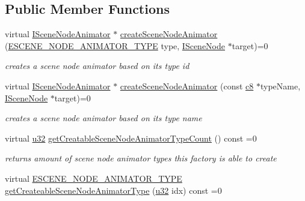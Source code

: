 \subsection*{Public Member Functions}
\begin{DoxyCompactItemize}
\item 
virtual \hyperlink{classirr_1_1scene_1_1ISceneNodeAnimator}{I\+Scene\+Node\+Animator} $\ast$ \hyperlink{classirr_1_1scene_1_1ISceneNodeAnimatorFactory_a509845a16fa1fdd7241bb10416327eb2}{create\+Scene\+Node\+Animator} (\hyperlink{namespaceirr_1_1scene_a327a1e43872705cf8f3f3342fb307d19}{E\+S\+C\+E\+N\+E\+\_\+\+N\+O\+D\+E\+\_\+\+A\+N\+I\+M\+A\+T\+O\+R\+\_\+\+T\+Y\+PE} type, \hyperlink{classirr_1_1scene_1_1ISceneNode}{I\+Scene\+Node} $\ast$target)=0
\begin{DoxyCompactList}\small\item\em creates a scene node animator based on its type id \end{DoxyCompactList}\item 
virtual \hyperlink{classirr_1_1scene_1_1ISceneNodeAnimator}{I\+Scene\+Node\+Animator} $\ast$ \hyperlink{classirr_1_1scene_1_1ISceneNodeAnimatorFactory_a093f1fb03d8e1c73ff60c8612b0ba778}{create\+Scene\+Node\+Animator} (const \hyperlink{namespaceirr_a9395eaea339bcb546b319e9c96bf7410}{c8} $\ast$type\+Name, \hyperlink{classirr_1_1scene_1_1ISceneNode}{I\+Scene\+Node} $\ast$target)=0
\begin{DoxyCompactList}\small\item\em creates a scene node animator based on its type name \end{DoxyCompactList}\item 
\mbox{\label{classirr_1_1scene_1_1ISceneNodeAnimatorFactory_a7b6f10b1e602714652636763e8617691}} 
virtual \hyperlink{namespaceirr_a0416a53257075833e7002efd0a18e804}{u32} \hyperlink{classirr_1_1scene_1_1ISceneNodeAnimatorFactory_a7b6f10b1e602714652636763e8617691}{get\+Creatable\+Scene\+Node\+Animator\+Type\+Count} () const =0
\begin{DoxyCompactList}\small\item\em returns amount of scene node animator types this factory is able to create \end{DoxyCompactList}\item 
virtual \hyperlink{namespaceirr_1_1scene_a327a1e43872705cf8f3f3342fb307d19}{E\+S\+C\+E\+N\+E\+\_\+\+N\+O\+D\+E\+\_\+\+A\+N\+I\+M\+A\+T\+O\+R\+\_\+\+T\+Y\+PE} \hyperlink{classirr_1_1scene_1_1ISceneNodeAnimatorFactory_a6b423730b46154f5e0c3bcfd21e41755}{get\+Createable\+Scene\+Node\+Animator\+Type} (\hyperlink{namespaceirr_a0416a53257075833e7002efd0a18e804}{u32} idx) const =0

\end{DoxyCompactItemize}

